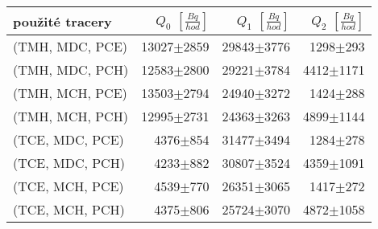 \begin{tabular}{lrrr}
\toprule
použité tracery & $Q_0$ $\left[\si{\frac{Bq}{hod}}\right]$ & $Q_1$ $\left[\si{\frac{Bq}{hod}}\right]$ & $Q_2$ $\left[\si{\frac{Bq}{hod}}\right]$ \\
\midrule
(TMH, MDC, PCE) &                             13027$\pm$2859 &                             29843$\pm$3776 &                               1298$\pm$293 \\
(TMH, MDC, PCH) &                             12583$\pm$2800 &                             29221$\pm$3784 &                              4412$\pm$1171 \\
(TMH, MCH, PCE) &                             13503$\pm$2794 &                             24940$\pm$3272 &                               1424$\pm$288 \\
(TMH, MCH, PCH) &                             12995$\pm$2731 &                             24363$\pm$3263 &                              4899$\pm$1144 \\
(TCE, MDC, PCE) &                               4376$\pm$854 &                             31477$\pm$3494 &                               1284$\pm$278 \\
(TCE, MDC, PCH) &                               4233$\pm$882 &                             30807$\pm$3524 &                              4359$\pm$1091 \\
(TCE, MCH, PCE) &                               4539$\pm$770 &                             26351$\pm$3065 &                               1417$\pm$272 \\
(TCE, MCH, PCH) &                               4375$\pm$806 &                             25724$\pm$3070 &                              4872$\pm$1058 \\
\bottomrule
\end{tabular}
